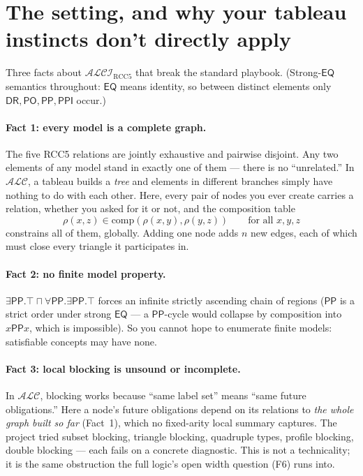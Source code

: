 \documentclass[11pt]{article}
\newcommand{\ALCIRCC}{\ensuremath{\mathcal{ALCI}_{\mathrm{RCC5}}}}
\newcommand{\DR}{\ensuremath{\mathsf{DR}}}
\newcommand{\PO}{\ensuremath{\mathsf{PO}}}
\newcommand{\PP}{\ensuremath{\mathsf{PP}}}
\newcommand{\PPI}{\ensuremath{\mathsf{PPI}}}
\newcommand{\EQ}{\ensuremath{\mathsf{EQ}}}
\newcommand{\Comp}{\mathrm{comp}}
\begin{document}
\section{The setting, and why your tableau instincts don't directly
apply}\label{sec:setting}

Three facts about $\ALCIRCC$ that break the standard playbook.
(Strong-$\EQ$ semantics throughout: $\EQ$ means identity, so between
distinct elements only $\DR,\PO,\PP,\PPI$ occur.)

\paragraph{Fact 1: every model is a complete graph.} The five RCC5
relations are jointly exhaustive and pairwise disjoint. Any two
elements of any model stand in exactly one of them --- there is no
``unrelated.'' In $\mathcal{ALC}$, a tableau builds a \emph{tree} and
elements in different branches simply have nothing to do with each
other. Here, every pair of nodes you ever create carries a relation,
whether you asked for it or not, and the composition table
\[
\rho(x,z)\in\Comp(\rho(x,y),\rho(y,z))\qquad\text{for all }x,y,z
\]
constrains all of them, globally. Adding one node adds $n$ new edges,
each of which must close every triangle it participates in.

\paragraph{Fact 2: no finite model property.}
$\exists\PP.\top\sqcap\forall\PP.\exists\PP.\top$ forces an infinite
strictly ascending chain of regions ($\PP$ is a strict order under
strong $\EQ$ --- a $\PP$-cycle would collapse by composition into
$x\mathbin{\PP}x$, which is impossible). So you cannot hope to
enumerate finite models: satisfiable concepts may have none.

\paragraph{Fact 3: local blocking is unsound or incomplete.} In
$\mathcal{ALC}$, blocking works because ``same label set'' means ``same
future obligations.'' Here a node's future obligations depend on its
relations to \emph{the whole graph built so far} (Fact~1), which no
fixed-arity local summary captures. The project tried subset blocking,
triangle blocking, quadruple types, profile blocking, double blocking
--- each fails on a concrete diagnostic. This is not a technicality; it
is the same obstruction the full logic's open width question (F6) runs
into.
\end{document}
